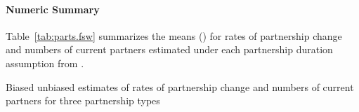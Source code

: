 \paragraph{Numeric Summary}
Table~\ref{tab:parts.fsw} summarizes the means (\ci) for
rates of partnership change and numbers of current partners
estimated under each partnership duration assumption from .
\begin{table}[h]
  \centering
  \caption{Biased \vs unbiased estimates of
    rates of partnership change and numbers of current partners
    for three partnership types}
  \label{tab:parts.fsw}
  
\end{table}
\printbibliography

